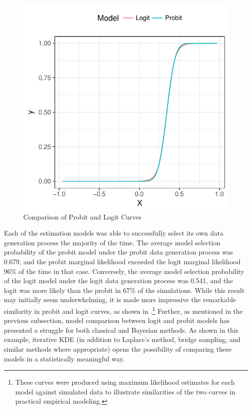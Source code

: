 \documentclass[twocolumn]{article}
\begin{document}
\begin{figure}
	\centering
	\includegraphics[width=\linewidth]{Probit-Logit-Fitted.pdf}
	\caption{Comparison of Probit and Logit Curves}
	\label{fig:Probit-Logit-Fit}
\end{figure}

Each of the estimation models was able to successfully select its own data generation process the majority of the time. The average model selection probability of the probit model under the probit data generation process was 0.679, and the probit marginal likelihood exceeded the logit marginal likelihood 96\% of the time in that case. Conversely, the average model selection probability of the logit model under the logit data generation process was 0.541, and the logit was more likely than the probit in 67\% of the simulations. While this result may initially seem underwhelming, it is made more impressive the remarkable similarity in probit and logit curves, as shown in .\footnote{These curves were produced using maximum likelihood estimates for each model against simulated data to illustrate similarities of the two curves in practical empirical modeling.}  Further, as mentioned in the previous subsection, model comparison between logit and probit models has presented a struggle for both classical and Bayesian methods. As shown in this example, iterative KDE (in addition to Laplace's method, bridge sampling, and similar methods where appropriate) opens the possibility of comparing these models in a statistically meaningful way.
\end{document}
